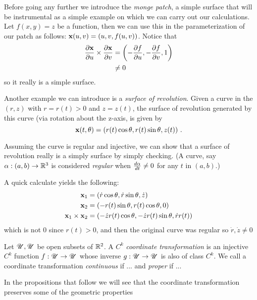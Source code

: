 Before going any further we introduce the \emph{monge patch}, a simple surface that will be instrumental as a simple example on which we can carry out our calculations. Let $f(x, y) = z$ be a function, then we can use this in the parameterization of our patch as follows: $\mathbf{x}(u, v) = (u, v, f(u, v))$. Notice that
\begin{align*}
  \frac{\partial\mathbf{x}}{\partial u} \times \frac{\partial\mathbf{x}}{\partial v} &= \left(-\frac{\partial f}{\partial u}, -\frac{\partial f}{\partial v}, 1\right)\\
  &\neq 0
\end{align*}
so it really is a simple surface.

Another example we can introduce is a \emph{surface of revolution}. Given a curve in the $(r, z)$ with $r = r(t) > 0$ and $z = z(t)$, the surface of revolution generated by this curve (via rotation about the z-axis, is given by
\[
  \mathbf{x}(t, \theta) = (r(t)\cos\theta, r(t)\sin\theta, z(t)) \ .
\]

Assuming the curve is regular and injective, we can show that a surface of revolution really is a simply surface by simply checking. (A curve, say $\mathbf{\alpha} : (a, b) \to \mathbb{R}^3$ is considered \emph{regular} when $\frac{d\mathbf{\alpha}}{dt} \neq 0$ for any $t$ in $(a, b)$.)

A quick calculate yields the following:
\begin{align*}
  \mathbf{x}_1 &= (\dot{r}\cos{\theta}, \dot{r}\sin{\theta}, \dot{z})\\
  \mathbf{x}_2 &= (-r(t)\sin{\theta}, r(t)\cos{\theta}, 0)\\
  \mathbf{x}_1 \times \mathbf{x}_2 &= (-\dot{z} r(t) \cos{\theta}, -\dot{z} r(t) \sin{\theta}, \dot{r}r(t))
\end{align*}
which is not $0$ since $r(t) > 0$, and then the original curve was regular so $\dot{r}, \dot{z} \neq 0$

\begin{defn}
  Let $\mathscr{U}, \mathscr{U}$ be open subsets of $\mathbb{R}^2$. A $C^k$ \emph{coordinate transformation} is an injective $C^k$ function $f: \mathscr{U} \to \mathscr{U}$ whose inverse $g:\mathscr{U} \to \mathscr{U}$ is also of class $C^k$. We call a coordinate transformation \emph{continuous} if ... and \emph{proper} if ...
\end{defn}

In the propositions that follow we will see that the coordinate transformation preserves some of the geometric properties 

